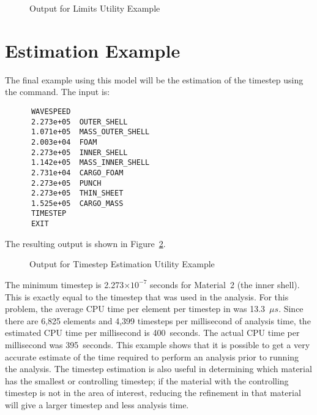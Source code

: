 \begin{figure}

\caption{Output for Limits Utility Example}\label{exlimitsout}
\end{figure}

\section{ Estimation Example}

The final example using this model will be the estimation of the
timestep using the  command.  The input is:

\begin{verbatim}
      WAVESPEED
      2.273e+05  OUTER_SHELL         
      1.071e+05  MASS_OUTER_SHELL    
      2.003e+04  FOAM                
      2.273e+05  INNER_SHELL         
      1.142e+05  MASS_INNER_SHELL    
      2.731e+04  CARGO_FOAM          
      2.273e+05  PUNCH               
      2.273e+05  THIN_SHEET          
      1.525e+05  CARGO_MASS          
      TIMESTEP 
      EXIT
\end{verbatim}

The resulting output is shown in Figure~\ref{extimestepout}.

\begin{figure}

\caption{Output for Timestep Estimation Utility
Example}\label{extimestepout}
\end{figure}
The minimum timestep is 2.273$\times 10^{-7}$ seconds for Material~2 (the inner
shell).  This is exactly equal to the timestep that was used in
the  analysis.  For this problem, the average CPU time
per element per timestep in  was 13.3~$\mu s$.  Since
there are 6,825 elements and 4,399 timesteps per millisecond of analysis
time, the estimated CPU time per millisecond is 400~seconds.  The actual
CPU time per millisecond was 395~seconds.  This example shows that it is
possible to get a very accurate estimate of the time required to perform
an analysis prior to running the analysis.  The timestep estimation is
also useful in determining which material has the smallest or
controlling timestep; if the material with the controlling timestep is
not in the area of interest, reducing the refinement in that material
will give a larger timestep and less analysis time. 


